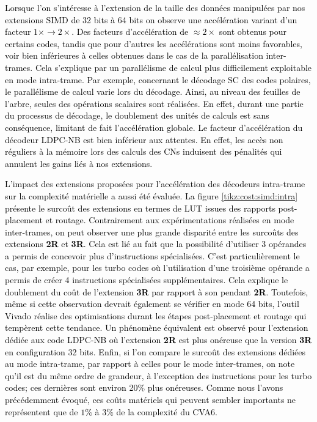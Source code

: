 \documentclass[../main.tex]{subfiles}
\begin{document}
\textcolor{black}{Lorsque l'on s'intéresse à l'extension de la taille des données manipulées par nos extensions SIMD de 32 bits à 64 bits on observe une accélération variant d'un facteur $1\times \rightarrow 2\times$. 
Des facteurs d'accélération de $\approx 2\times$ sont obtenus pour certains codes, tandis que pour d'autres les accélérations sont moins favorables, voir bien inférieures à celles obtenues dans le cas de la parallélisation inter-trames.
Cela s'explique par un parallélisme de calcul plus difficilement exploitable en mode intra-trame.
Par exemple, concernant le décodage SC des codes polaires, le parallélisme de calcul varie lors du décodage.
Ainsi, au niveau des feuilles de l'arbre, seules des opérations scalaires sont réalisées.
En effet, durant une partie du processus de décodage, le doublement des unités de calculs est sans conséquence, limitant de fait l'accélération globale.
Le facteur d'accélération du décodeur LDPC-NB est bien inférieur aux attentes.
En effet, les accès non réguliers à la mémoire lors des calculs des CNs induisent des pénalités qui annulent les gains liés à nos extensions.}

\textcolor{black}{L'impact des extensions proposées pour l'accélération des décodeurs intra-trame sur la complexité matérielle a aussi été évaluée.
La figure \ref{tikz:cost:simd:intra} présente le surcoût des extensions en termes de LUT issues des rapports post-placement et routage.
Contrairement aux expérimentations réalisées en mode inter-trames, on peut observer une plus grande disparité entre les surcoûts des extensions \textbf{2R} et \textbf{3R}. 
Cela est lié au fait que la possibilité d'utiliser $3$ opérandes a permis de concevoir plus d'instructions spécialisées. 
C'est particulièrement le cas, par exemple, pour les turbo codes où l'utilisation d'une troisième opérande a permis de créer 4 instructions spécialisées supplémentaires.
Cela explique le doublement du coût de l'extension \textbf{3R} par rapport à son pendant \textbf{2R}.
Toutefois, même si cette observation devrait également se vérifier en mode 64 bits, l'outil Vivado réalise des optimisations durant les étapes post-placement et routage qui tempèrent cette tendance.
Un phénomène équivalent est observé pour l'extension dédiée aux code LDPC-NB où l'extension \textbf{2R} est plus onéreuse que la version \textbf{3R} en configuration 32 bits.
Enfin, si l'on compare le surcoût des extensions dédiées au mode intra-trame, par rapport à celles pour le mode inter-trames, on note qu'il est du même ordre de grandeur, à l'exception des instructions pour les turbo codes; ces dernières sont environ 20\% plus onéreuses. 
Comme nous l'avons précédemment évoqué, ces coûts matériels qui peuvent sembler importants ne représentent que de $1\%$ à $3\%$ de la complexité du CVA6.}
\end{document}
